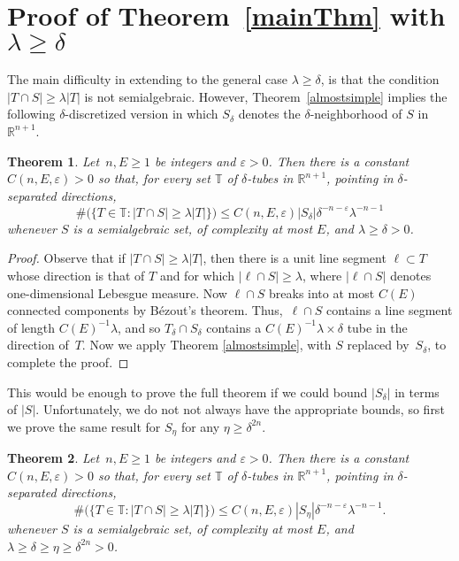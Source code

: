 \documentclass[letterpaper, reqno, 11pt]{amsart}
\newtheorem{thm}{Theorem}[section]
\theoremstyle{remark}
\numberwithin{equation}{section}
\begin{document}
\section{Proof of Theorem~\ref{mainThm} with $\lambda\ge \delta$}

The main difficulty in extending to the general case $\lambda\ge \delta$, is that  the condition 
$|T \cap S| \geq \lambda |T|$ is not semialgebraic. However, Theorem~\ref{almostsimple}  implies the following $\delta$-discretized version in which $S_{\delta}$ denotes the $\delta$-neighborhood of $S$ in $\mathbb{R}^{n+1}$.





\begin{thm}\label{prettysimple}
Let~$n,E\ge 1$ be integers and $\varepsilon>0$. Then there is a constant $C(n,E,\varepsilon)>0$ so that, for every set $\mathbb{T}$ of $\delta$-tubes in $\mathbb{R}^{n+1}$, pointing in  $\delta$-separated directions, 
\begin{equation*}\#\big(\big\{ T \in \mathbb{T} :  |T \cap S| \geq \lambda |T| \big\}\big) \leq C(n,E,\varepsilon) |S_\delta| \delta^{-n-\varepsilon} \lambda^{-n-1}\end{equation*}
whenever $S$ is a semialgebraic set, of complexity at most $E$, and $\lambda\ge \delta>0$.
\end{thm}

\begin{proof} Observe that if $|T \cap S| \ge \lambda |T|$, then there is a unit line segment
$\ell\subset T$ whose direction is that of $T$ and for which $|\ell \cap S| \geq \lambda$, where $|\ell \cap S|$ denotes one-dimensional Lebesgue measure. Now $\ell \cap S$ breaks into at most $C(E)$ connected components by B\'ezout's theorem. Thus,~$\ell \cap S$ contains a line segment of length $C(E)^{-1}\lambda$, and so $T_{\delta} \cap S_{\delta}$ contains a $C(E)^{-1}\lambda \times \delta$
tube in the direction of~$T$. Now we apply Theorem \ref{almostsimple}, with $S$ replaced by~$S_{\delta}$, to complete the proof. \end{proof}

This would be enough to prove the full theorem if we could bound $|S_{\delta}|$ in terms of $|S|$. Unfortunately, we do not not always have the appropriate bounds, so first we prove the same result for $S_{\eta}$ for any $\eta \ge \delta^{2n}.$

\begin{thm}\label{Netsisntfunny}
Let~$n,E\ge 1$ be integers and $\varepsilon>0$. Then there is a constant $C(n,E,\varepsilon)>0$ so that, for every set $\mathbb{T}$ of $\delta$-tubes in $\mathbb{R}^{n+1}$, pointing in  $\delta$-separated directions, 
$$\#\big(\big\{ T \in \mathbb{T} :  |T \cap S| \geq \lambda |T| \big\}\big) \leq C(n,E,\varepsilon) |S_\eta| \delta^{-n-\varepsilon} \lambda^{-n-1}.$$
whenever $S$ is a semialgebraic set, of complexity at most $E$, and $\lambda\ge \delta \ge \eta\ge \delta^{2n}>0$.
\end{thm}
\end{document}
